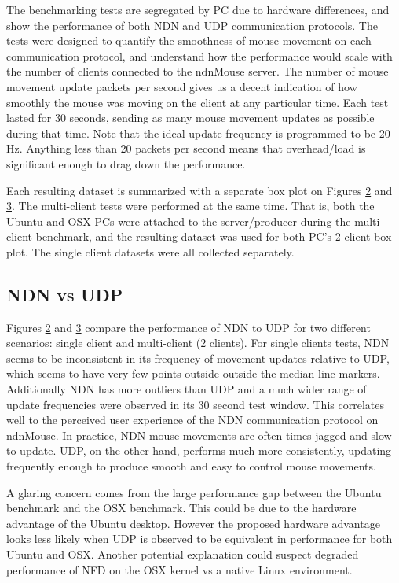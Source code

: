 \documentclass{sig-alternate}
\renewcommand\_{\textunderscore\allowbreak}  %
\begin{document}
The benchmarking tests are segregated by PC due to hardware differences, and show the performance of both NDN and UDP communication protocols. The tests were designed to quantify the smoothness of mouse movement on each communication protocol, and understand how the performance would scale with the number of clients connected to the ndnMouse server. The number of mouse movement update packets per second gives us a decent indication of how smoothly the mouse was moving on the client at any particular time. Each test lasted for 30 seconds, sending as many mouse movement updates as possible during that time. Note that the ideal update frequency is programmed to be 20 Hz. Anything less than 20 packets per second means that overhead/load is significant enough to drag down the performance. 

Each resulting dataset is summarized with a separate box plot on Figures \hyperlink{fig:ubuntuBenchmark}{2} and \hyperlink{fig:osxBenchmark}{3}. The multi-client tests were performed at the same time. That is, both the Ubuntu and OSX PCs were attached to the server/producer during the multi-client benchmark, and the resulting dataset was used for both PC's 2-client box plot. The single client datasets were all collected separately.

\subsection{NDN vs UDP}
Figures \hyperlink{fig:ubuntuBenchmark}{2} and \hyperlink{fig:osxBenchmark}{3} compare the performance of NDN to UDP for two different scenarios: single client and multi-client (2 clients). For single clients tests, NDN seems to be inconsistent in its frequency of movement updates relative to UDP, which seems to have very few points outside outside the median line markers. Additionally NDN has more outliers than UDP and a much wider range of update frequencies were observed in its 30 second test window. This correlates well to the perceived user experience of the NDN communication protocol on ndnMouse. In practice, NDN mouse movements are often times jagged and slow to update. UDP, on the other hand, performs much more consistently, updating frequently enough to produce smooth and easy to control mouse movements.

A glaring concern comes from the large performance gap between the Ubuntu benchmark and the OSX benchmark. This could be due to the hardware advantage of the Ubuntu desktop. However the proposed hardware advantage looks less likely when UDP is observed to be equivalent in performance for both Ubuntu and OSX. Another potential explanation could suspect degraded performance of NFD on the OSX kernel vs a native Linux environment.
\end{document}
